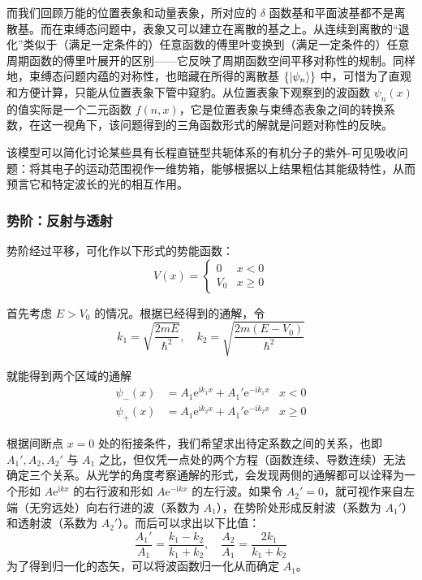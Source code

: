 \documentclass[cn,10pt,math=newtx,citestyle=gb7714-2015,bibstyle=gb7714-2015]{elegantbook}
\def\e{\mathrm e}
\def\i{\mathrm i}
\begin{document}
而我们回顾万能的位置表象和动量表象，所对应的 $\delta$ 函数基和平面波基都不是离散基。而在束缚态问题中，表象又可以建立在离散的基之上。从连续到离散的“退化”类似于（满足一定条件的）任意函数的傅里叶变换到（满足一定条件的）任意周期函数的傅里叶展开的区别——它反映了周期函数空间平移对称性的规制。同样地，束缚态问题内蕴的对称性，也暗藏在所得的离散基 $\{\ket{\psi_n}\}$ 中，可惜为了直观和方便计算，只能从位置表象下管中窥豹。从位置表象下观察到的波函数 $\psi_n(x)$ 的值实际是一个二元函数 $f(n,x)$，它是位置表象与束缚态表象之间的转换系数，在这一视角下，该问题得到的三角函数形式的解就是问题对称性的反映。

该模型可以简化讨论某些具有长程直链型共轭体系的有机分子的紫外-可见吸收问题：将其电子的运动范围视作一维势箱，能够根据以上结果粗估其能级特性，从而预言它和特定波长的光的相互作用。

\subsubsection{势阶：反射与透射}
势阶经过平移，可化作以下形式的势能函数：
\begin{equation}
    V(x)=\begin{cases}
        0 & x<0\\
        V_0 & x\ge 0
    \end{cases}
\end{equation}

首先考虑 $E>V_0$ 的情况。根据已经得到的通解，令
\begin{equation*}
    k_1=\sqrt{\frac{2mE}{\hbar^2}},\quad k_2=\sqrt{\frac{2m(E-V_0)}{\hbar^2}}
\end{equation*}

就能得到两个区域的通解
\begin{align}
    \psi_-(x)&=A_1\e^{\i k_1x}+A_1'\e^{-\i k_1x} & x<0\\
    \psi_+(x)&=A_1\e^{\i k_2x}+A_1'\e^{-\i k_2x} & x\ge 0
\end{align}

根据间断点 $x=0$ 处的衔接条件，我们希望求出待定系数之间的关系，也即 $A_1',A_2,A_2'$ 与 $A_1$ 之比，但仅凭一点处的两个方程（函数连续、导数连续）无法确定三个关系。从光学的角度考察通解的形式，会发现两侧的通解都可以诠释为一个形如 $A\e^{\i kx}$ 的右行波和形如 $A\e^{-\i kx}$ 的左行波。如果令 $A_2'=0$，就可视作来自左端（无穷远处）向右行进的波（系数为 $A_1$），在势阶处形成反射波（系数为 $A_1'$）和透射波（系数为 $A_2'$）。而后可以求出以下比值：
\begin{equation*}
    \frac{A_1'}{A_1}=\frac{k_1-k_2}{k_1+k_2},\quad \frac{A_2}{A_1}=\frac{2k_1}{k_1+k_2}
\end{equation*}
为了得到归一化的态矢，可以将波函数归一化从而确定 $A_1$。
\end{document}
